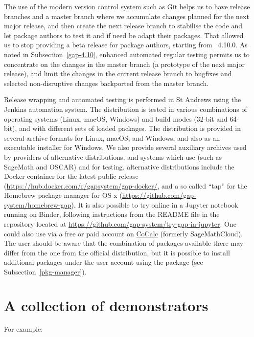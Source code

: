 \documentclass{deliverablereport}
\begin{document}
The use of the modern version control system such as {\sf Git}
helps us to have release branches and a master branch
where we accumulate changes planned for the next major release, and then
create the next release branch to stabilise the code and let package
authors to test it and if need be adapt their packages. That allowed
us to stop providing a beta release for package authors, starting from
\GAP~4.10.0. As noted in Subsection~\ref{gap-4.10},
enhanced automated regular testing permits us to concentrate on 
the changes in the master branch (a prototype of the next major release), and limit 
the changes in the current release branch to bugfixes and selected 
non-disruptive changes backported from the master branch.

Release wrapping and automated testing is performed in St Andrews
using the Jenkins automation system. The \GAP distribution is tested
in various combinations of operating systems (Linux, macOS, Windows)
and build modes (32-bit and 64-bit), and with different sets of
loaded packages.
The \GAP distribution is provided in several archive formats for
Linux, macOS, and Windows,
and also as an executable installer for Windows.
We also provide several auxiliary archives used by providers of alternative
distributions, and systems which use \GAP (such as SageMath and OSCAR)
and for testing.
\GAP alternative distributions include the Docker container for the 
latest public \GAP release (\url{https://hub.docker.com/r/gapsystem/gap-docker/},
and a so called ``tap'' for the Homebrew package manager for OS x
(\url{https://github.com/gap-system/homebrew-gap}). 
It is also possible to try \GAP online in a Jupyter notebook running 
on Binder, following instructions from the README file in the repository
located at \url{https://github.com/gap-system/try-gap-in-jupyter}.
One could also use \GAP via a free or paid account
on \href{https://cocalc.com/}{\sf CoCalc} (formerly SageMathCloud).
The user should be aware that the combination of \GAP packages 
available there may differ from the one from the official \GAP distribution,
but it is possible to install additional packages under the user account
using the  package (see Subsection~\ref{pkg-manager}).

\section{A collection of demonstrators}\label{demos}

For example:
\end{document}
